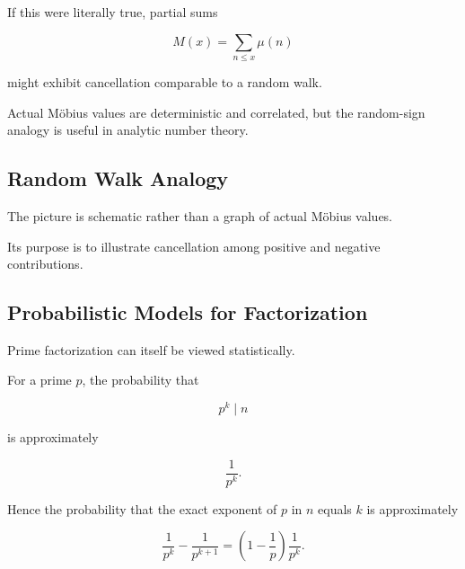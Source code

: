 If this were literally true, partial sums

\[ M(x)=\sum_{n\leq x}\mu(n) \]

might exhibit cancellation comparable to a random walk.

Actual Möbius values are deterministic and correlated, but the random-sign
analogy is useful in analytic number theory.

\subsection{Random Walk Analogy}
\label{subsec:mobius-random-walk-visual}

\begin{centereddiagram}
\end{centereddiagram}

The picture is schematic rather than a graph of actual Möbius values.

Its purpose is to illustrate cancellation among positive and negative
contributions.

\subsection{Probabilistic Models for Factorization}
\label{subsec:probabilistic-factorization-models}

Prime factorization can itself be viewed statistically.

For a prime \(p\), the probability that

\[ p^k\mid n \]

is approximately

\[ \frac1{p^k}. \]

Hence the probability that the exact exponent of \(p\) in \(n\) equals \(k\)
is approximately

\[
\frac1{p^k}-\frac1{p^{k+1}}
=
\left(1-\frac1p\right)\frac1{p^k}.
\]

